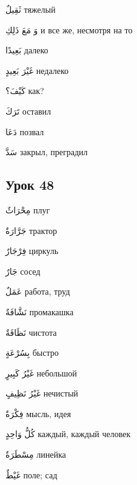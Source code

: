 \documentclass[a5paper]{article}
\newcommand\textstyleDropCaps[1]{#1}
\newcommand\textstyleCaptioncharacters[1]{#1}
\begin{document}
\textstyleCaptioncharacters{ثَقِيلٌ }\textstyleDropCaps{тяжелый‎}

\textstyleCaptioncharacters{وَ مَعَ ذَلِكِ }\textstyleDropCaps{и все же, не­смотря на то‎}

\textstyleCaptioncharacters{بَعِيدًا }\textstyleDropCaps{далеко‎}

\textstyleCaptioncharacters{غَيْرَ بَعِيدٍ }\textstyleDropCaps{недалеко‎}

\textstyleCaptioncharacters{كَيْفَ؟ }\textstyleDropCaps{как?‎}

\textstyleCaptioncharacters{تَرَكَ }\textstyleDropCaps{оставил‎}

\textstyleCaptioncharacters{دَعَا }\textstyleDropCaps{позвал‎}

\textstyleCaptioncharacters{سَدَّ }\textstyleDropCaps{закрыл, преградил‎}

\subsection[Урок 48‎]{\textstyleDropCaps{Урок 48‎}}
\textstyleCaptioncharacters{مِحْرَاثٌ }\textstyleDropCaps{плуг‎}

\textstyleCaptioncharacters{جَرَّارَةٌ }\textstyleDropCaps{трактор‎}

\textstyleCaptioncharacters{فِرْجَارٌ }\textstyleDropCaps{циркуль‎}

\textstyleCaptioncharacters{جَارٌ }\textstyleDropCaps{сосед‎}

\textstyleCaptioncharacters{عَمَلٌ }\textstyleDropCaps{работа, труд‎}

\textstyleCaptioncharacters{نَشَّافَةٌ }\textstyleDropCaps{промакашка‎}

\textstyleCaptioncharacters{نَظَافَةٌ }\textstyleDropCaps{чистота‎}

\textstyleCaptioncharacters{بِسُرْعَةٍ }\textstyleDropCaps{быстро‎}

\textstyleCaptioncharacters{غَيْرُ كَبِيرٍ }\textstyleDropCaps{небольшой‎}

\textstyleCaptioncharacters{غَيْرُ نَظِيفٍ }\textstyleDropCaps{нечистый‎}

\textstyleCaptioncharacters{فِكْرَةٌ }\textstyleDropCaps{мысль, идея‎}

\textstyleCaptioncharacters{كُلُّ وَاحِدٍ }\textstyleDropCaps{каждый, каж­дый человек‎}

\textstyleCaptioncharacters{مِسْطَرَةٌ }\textstyleDropCaps{линейка‎}

\textstyleCaptioncharacters{غَيْطٌ }\textstyleDropCaps{поле; сад‎}
\end{document}
